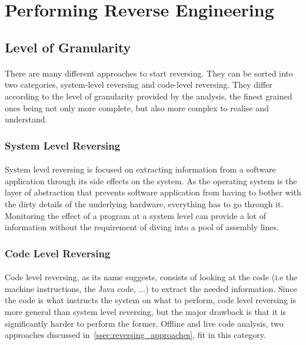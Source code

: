 \section{Performing Reverse Engineering} \label{sec:performing_reverse_engineering}

\subsection{Level of Granularity}
\paragraph{}
There are many different approaches to start reversing. They can be sorted into two categories, system-level reversing and code-level reversing. They differ according to the level of granularity provided by the analysis, the finest grained ones being not only more complete, but also more complex to realise and understand.

\subsubsection{System Level Reversing}
\paragraph{}
System level reversing is focused on extracting information from a software application through its side effects on the system. As the operating system is the layer of abstraction that prevents software application from having to bother with the dirty details of the underlying hardware, everything has to go through it. Monitoring the effect of a program at a system level can provide a lot of information without the requirement of diving into a pool of assembly lines.

\subsubsection{Code Level Reversing}
\paragraph{}
Code level reversing, as its name suggests, consists of looking at the code (i.e the machine instructions, the Java code, ...) to extract the needed information. Since the code is what instructs the system on what to perform, code level reversing is more general than system level reversing, but the major drawback is that it is significantly harder to perform the former. Offline and live code analysis, two approaches discussed in~\ref{ssec:reversing_approaches}, fit in this category.


